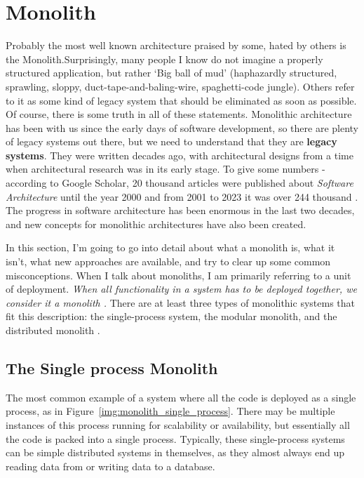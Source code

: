 
\section{Monolith}
Probably the most well known architecture praised by some, hated by others is the Monolith.Surprisingly, many people I know do not imagine a properly structured application, but rather `Big ball of mud' \cite{BIG_BALL_OF_MUD} (haphazardly structured, sprawling, sloppy, duct-tape-and-baling-wire, spaghetti-code jungle). Others refer to it as some kind of legacy system that should be eliminated as soon as possible. Of course, there is some truth in all of these statements. Monolithic architecture has been with us since the early days of software development, so there are plenty of legacy systems out there, but we need to understand that they are \textbf{legacy systems}. They were written decades ago, with architectural designs from a time when architectural research was in its early stage. To give some numbers - according to Google Scholar, 20 thousand articles were published about \textit{Software Architecture} until the year 2000 \cite{SCHOLAR_2000} and from 2001 to 2023 it was over 244 thousand \cite{SCHOLAR_2001_2023}. The progress in software architecture has been enormous in the last two decades, and new concepts for monolithic architectures have also been created.

In this section, I'm going to go into detail about what a monolith is, what it isn't, what new approaches are available, and try to clear up some common misconceptions. When I talk about monoliths, I am primarily referring to a unit of deployment\cite{MON_TO_MS_MONOLITH}. \textit{When all functionality in a system has to be deployed together, we consider it a monolith \cite{MON_TO_MS_MONOLITH}.} There are at least three types of monolithic systems that fit this description: the single-process system, the modular monolith, and the distributed monolith \cite{BUILDING_MS_MONOLITH}.


\subsection{The Single process Monolith}
The most common example of a system where all the code is deployed as a single process, as in Figure~\ref{img:monolith_single_process}. There may be multiple instances of this process running for scalability or availability, but essentially all the code is packed into a single process. Typically, these single-process systems can be simple distributed systems in themselves, as they almost always end up reading data from or writing data to a database. \cite{MON_TO_MS_MONOLITH}

